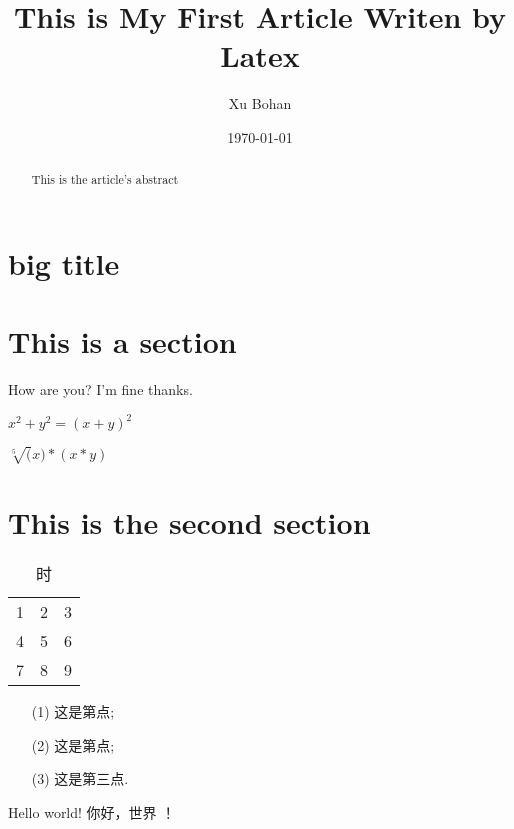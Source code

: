 \documentclass[a4paper]{article}
\title{This is My First Article Writen by Latex}
\author{Xu Bohan}
\date{\today}
\begin{document}
\maketitle

\begin{abstract}
    This is the article's abstract
\end{abstract}

\tableofcontents

\section{big title}

\section{This is a section}
How are you?
I'm fine thanks.

$x^2+y^2 = (x+y)^2$

$\sqrt[5](x)*(x*y)$
\section{This is the second section}
\begin{table}[htbp]
    \centering
    \caption{时}
    \begin{tabular}{ccc}
        1 & 2 & 3 \\
        4 & 5 & 6 \\
        7 & 8 & 9
    \end{tabular}\label{tab:table}
\end{table}

\begin{enumerate}
    \item[(1)] 这是第点;
    \item[(2)] 这是第点;
    \item[(3)] 这是第三点.
\end{enumerate}

Hello world!
你好，世界 ！
\end{document}
